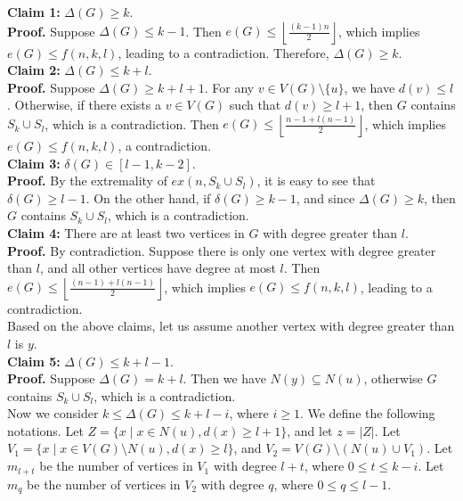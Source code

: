 \documentclass[12pt]{elsarticle}
\begin{document}
\textbf{Claim 1:} $\Delta(G) \ge k$.  \\

\textbf{Proof.} Suppose $\Delta(G) \le k-1$. Then $e(G) \le \left\lfloor \frac{(k-1)n}{2} \right\rfloor$, which implies $e(G) \le f(n, k, l)$, leading to a contradiction. Therefore, $\Delta(G) \ge k$.   \\

\textbf{Claim 2:} $\Delta(G) \le k + l$. \\

\textbf{Proof.} Suppose $\Delta(G) \ge k + l + 1$. For any $v \in V(G) \setminus \{u\}$, we have $d(v) \le l$. Otherwise, if there exists a $v \in V(G)$ such that $d(v) \ge l + 1$, then $G$ contains $S_k \cup S_l$, which is a contradiction.  Then $e(G) \le \left\lfloor \frac{n-1+l(n-1)}{2} \right\rfloor$, which implies $e(G) \le f(n, k, l)$, a contradiction.  \\

\textbf{Claim 3:} $\delta(G) \in [l - 1, k - 2]$. \\

\textbf{Proof.} By the extremality of $ex(n, S_{k} \cup S_{l})$, it is easy to see that $\delta(G) \ge l - 1$. On the other hand, if $\delta(G) \ge k - 1$, and since $\Delta(G) \ge k$, then $G$ contains $S_k \cup S_l$, which is a contradiction.   \\

\textbf{Claim 4:} There are at least two vertices in $G$ with degree greater than $l$. \\

\textbf{Proof.} By contradiction. Suppose there is only one vertex with degree greater than $l$, and all other vertices have degree at most $l$. Then $e(G) \le \left\lfloor \frac{(n - 1) + l(n - 1)}{2} \right\rfloor$, which implies $e(G) \le f(n, k, l) $, leading to a contradiction. \\

Based on the above claims, let us assume another vertex with degree greater than $l$ is $y$. \\

\textbf{Claim 5:} $\Delta(G) \le k + l - 1$. \\

\textbf{Proof.} Suppose $\Delta(G) = k + l$. Then we have $N(y) \subseteq N(u)$, otherwise $G$ contains $S_k \cup S_l$, which is a contradiction. \\

Now we consider $k \le \Delta(G) \le k + l - i$, where $i \ge 1$.
We define the following notations. Let $Z = \{x \mid x \in N(u), d(x) \ge l + 1\}$, and let $z = |Z|$. Let $V_1 = \{x \mid x \in V(G) \setminus N(u), d(x) \ge l\}$, and $V_2 = V(G) \setminus (N(u) \cup V_1)$. Let $m_{l+t}$ be the number of vertices in $V_1$ with degree $l + t$, where $0 \le t \le k - i$. Let $m_q$ be the number of vertices in $V_2$ with degree $q$, where $0 \le q \le l - 1$. 
\end{document}
